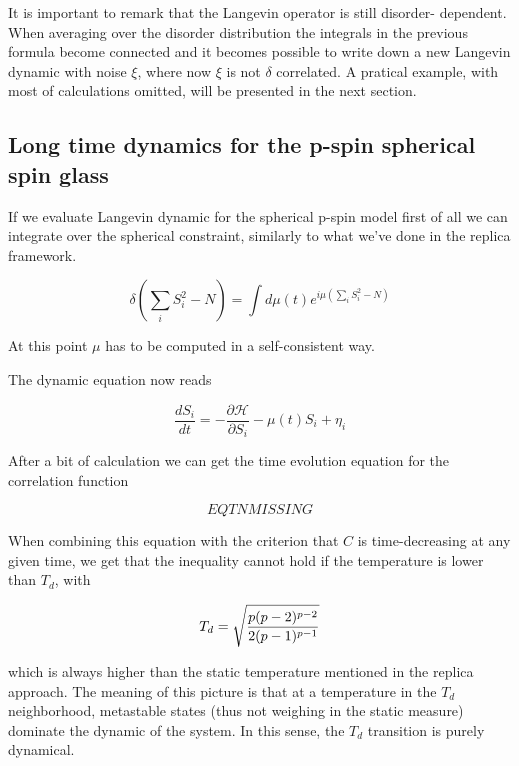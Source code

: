\documentclass{article}
\begin{document}
It is important to remark that the Langevin operator is still disorder- dependent. When averaging over the disorder distribution
the integrals in the previous formula become connected and it becomes possible to write down a new Langevin dynamic with noise $\xi$, where now
$\xi$ is not $\delta$ correlated. A pratical example, with most of calculations omitted, will be presented in the next section.

\subsection{Long time dynamics for the p-spin spherical spin glass}

If we evaluate Langevin dynamic for the spherical p-spin model first of all we can integrate over the spherical constraint, similarly to what we've done in the replica framework.

\begin{equation}
\delta( \sum_i S_i^2 -N) = \int d\mu(t) e^{i\mu ( \sum_i S_i^2 -N) }
\end{equation}

At this point $\mu$ has to be computed in a self-consistent way. 


The dynamic equation now reads

\begin{equation}
  \frac{dS_i}{dt} = - \frac{\partial \mathcal{H}}{\partial S_i} - \mu (t) S_i + \eta_i
\end{equation}

After a bit of calculation we can get the time evolution equation for the correlation function

\begin{equation}
EQTN MISSING
\end{equation}

When combining this equation with the criterion that $C$ is time-decreasing at any given time, we get that
the inequality cannot hold if the temperature is lower than $T_d$, with 

\begin{equation}
T_d = \sqrt{  {p(p-2)^{p-2}}      \over      {2(p-1)^{p-1}}} 
\end{equation}

which is always higher than the static temperature mentioned in the replica approach.
 The meaning of this picture is that at a temperature in the $T_d$ neighborhood, 
metastable states (thus not weighing in the static measure) dominate the dynamic of the system.
 In this sense, the $T_d$ transition is purely dynamical.
\end{document}
